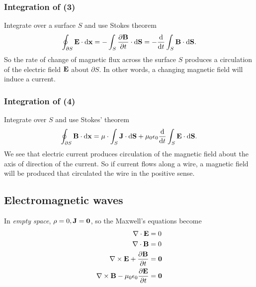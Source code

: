 \subsubsection*{Integration of (3)}
Integrate over a surface $S$ and use Stokes theorem
\[
    \oint_{\partial S} {\bf E}\cdot\mathrm{d}{\bf x} = - \int_{S} \frac{\partial {\bf B}}{\partial t}  \cdot\mathrm{d}\mathbf{S} = -\frac{\mathrm{d}}{\mathrm{d}t} \int_{S} {\bf B} \cdot\mathrm{d}\mathbf{S} .
\]
So the rate of change of magnetic flux across the surface $S$ produces a circulation of the electric field ${\bf E}$ about $\partial S$. In other words, a changing magnetic field will induce a current.

\subsubsection*{Integration of (4)}
Integrate over $S$ and use Stokes' theorem 
\[
    \oint_{\partial S} {\bf B} \cdot\mathrm{d}\mathbf{x} = \mu \cdot \int_{S} {\bf J} \cdot\mathrm{d}\mathbf{S} + \mu_0 \epsilon_0 \frac{\mathrm{d}}{\mathrm{d}t}\int_{S} {\bf E} \cdot\mathrm{d}\mathbf{S} .
\]
We see that electric current produces circulation of the magnetic field about the axis of direction of the current. So if current flows along a wire, a magnetic field will be produced that circulated the wire in the positive sense.

\subsection{Electromagnetic waves}
In \textit{empty space}, $ \rho=0,{\bf J}=\mathbf{0} $, so the Maxwell's equations become
\begin{align*}
    \nabla\cdot {\bf E} &= 0\\ 
    \nabla\cdot{\bf B}&= 0\\ 
    \nabla\times{\bf E}+\frac{\partial {\bf B}}{\partial t}&=\mathbf{0} \\ 
    \nabla\times{\bf B}-\mu_0 \epsilon_0 \frac{\partial {\bf E}}{\partial t}&=\mathbf{0}
\end{align*}


